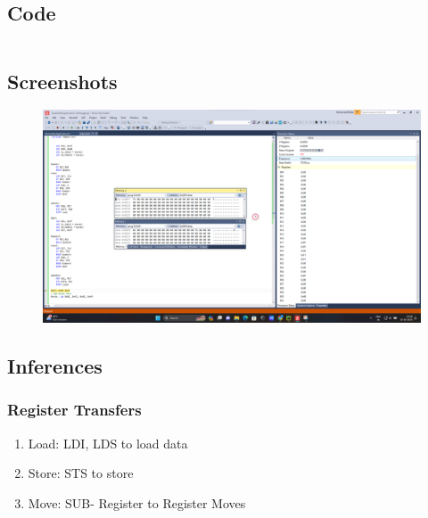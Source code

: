 \documentclass[titlepage, 11pt]{article}
\begin{document}
\begin{center}
\begin{tikzpicture}[node distance=2cm]
\end{tikzpicture}
\end{center}

\subsection{Code}
{\renewcommand\fcolorbox[4][]{\textcolor{black}{\strut#4}}
\inputminted[breaklines,
 mathescape,
 linenos,
 numbersep=5pt,
 frame=single,
 numbersep=5pt,
 xleftmargin=0pt]{asm}{"Prob4.asm"}}

\subsection{Screenshots}
\begin{figure}[H]
  \centering
  \includegraphics[width=1\linewidth]{prob4.png}
  \label{fig:B}
\end{figure}
\subsection{Inferences}

\subsubsection{Register Transfers}
\begin{enumerate}
\item Load: LDI, LDS to load data
\item Store: STS to store
\item Move: SUB- Register to Register Moves
\end{enumerate}
\end{document}
